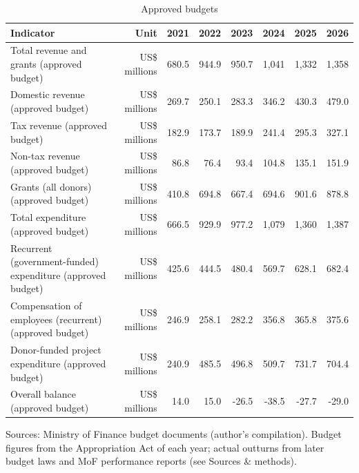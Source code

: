 \begin{table}[htbp]\centering
\caption{Approved budgets}
\begin{tabular}{lrrrrrrr}
\toprule
Indicator & Unit & 2021 & 2022 & 2023 & 2024 & 2025 & 2026 \\
\midrule
Total revenue and grants (approved budget) & US\$ millions & 680.5 & 944.9 & 950.7 & 1,041 & 1,332 & 1,358 \\
Domestic revenue (approved budget) & US\$ millions & 269.7 & 250.1 & 283.3 & 346.2 & 430.3 & 479.0 \\
Tax revenue (approved budget) & US\$ millions & 182.9 & 173.7 & 189.9 & 241.4 & 295.3 & 327.1 \\
Non-tax revenue (approved budget) & US\$ millions & 86.8 & 76.4 & 93.4 & 104.8 & 135.1 & 151.9 \\
Grants (all donors) (approved budget) & US\$ millions & 410.8 & 694.8 & 667.4 & 694.6 & 901.6 & 878.8 \\
Total expenditure (approved budget) & US\$ millions & 666.5 & 929.9 & 977.2 & 1,079 & 1,360 & 1,387 \\
Recurrent (government-funded) expenditure (approved budget) & US\$ millions & 425.6 & 444.5 & 480.4 & 569.7 & 628.1 & 682.4 \\
Compensation of employees (recurrent) (approved budget) & US\$ millions & 246.9 & 258.1 & 282.2 & 356.8 & 365.8 & 375.6 \\
Donor-funded project expenditure (approved budget) & US\$ millions & 240.9 & 485.5 & 496.8 & 509.7 & 731.7 & 704.4 \\
Overall balance (approved budget) & US\$ millions & 14.0 & 15.0 & -26.5 & -38.5 & -27.7 & -29.0 \\
\bottomrule
\end{tabular}
\par\smallskip\footnotesize Sources: Ministry of Finance budget documents (author's compilation). Budget figures from the Appropriation Act of each year; actual outturns from later budget laws and MoF performance reports (see Sources \& methods).
\end{table}
